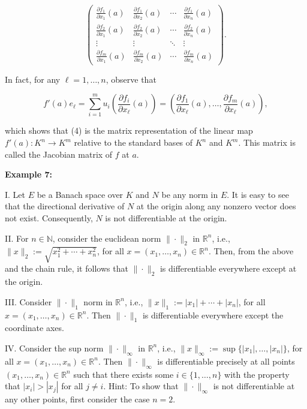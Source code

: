 \documentclass{book}
\begin{document}
\[
\begin{pmatrix}
\frac{\partial f_1}{\partial x_1}(a) & \frac{\partial f_1}{\partial x_2}(a) & \cdots & \frac{\partial f_1}{\partial x_n}(a) \\
\frac{\partial f_2}{\partial x_1}(a) & \frac{\partial f_2}{\partial x_2}(a) & \cdots & \frac{\partial f_2}{\partial x_n}(a) \\
\vdots & \vdots & \ddots & \vdots \\
\frac{\partial f_m}{\partial x_1}(a) & \frac{\partial f_m}{\partial x_2}(a) & \cdots & \frac{\partial f_m}{\partial x_n}(a)
\end{pmatrix}.
\tag{4}
\]

In fact, for any $\ell = 1, \ldots, n$, observe that

\[
f'(a)e_\ell
=
\sum_{i=1}^{m} u_i \left( \frac{\partial f_i}{\partial x_\ell}(a) \right)
=
\left( \frac{\partial f_1}{\partial x_\ell}(a), \ldots, \frac{\partial f_m}{\partial x_\ell}(a) \right),
\]

which shows that (4) is the matrix representation of the linear map $f'(a) : K^n \to K^m$ relative to the standard bases of $K^n$ and $K^m$. This matrix is called the Jacobian matrix of $f$ at $a$.

\textbf{Example 7:}

I. Let $E$ be a Banach space over $K$ and $N$ be any norm in $E$. It is easy to see that the directional derivative of $N$ at the origin along any nonzero vector does not exist. Consequently, $N$ is not differentiable at the origin.

II. For $n \in \mathbb{N}$, consider the euclidean norm $\|\cdot\|_2$ in $\mathbb{R}^n$, i.e., $\|x\|_2 := \sqrt{x_1^2 + \cdots + x_n^2}$, for all $x = (x_1, \ldots, x_n) \in \mathbb{R}^n$. Then, from the above and the chain rule, it follows that $\|\cdot\|_2$ is differentiable everywhere except at the origin.

III. Consider $\|\cdot\|_1$ norm in $\mathbb{R}^n$, i.e., $\|x\|_1 := |x_1| + \cdots + |x_n|$, for all $x = (x_1, \ldots, x_n) \in \mathbb{R}^n$. Then $\|\cdot\|_1$ is differentiable everywhere except the coordinate axes.

IV. Consider the sup norm $\|\cdot\|_\infty$ in $\mathbb{R}^n$, i.e., $\|x\|_\infty := \sup\{|x_1|, \ldots, |x_n|\}$, for all $x = (x_1, \ldots, x_n) \in \mathbb{R}^n$. Then $\|\cdot\|_\infty$ is differentiable precisely at all points $(x_1, \ldots, x_n) \in \mathbb{R}^n$ such that there exists some $i \in \{1, \ldots, n\}$ with the property that $|x_i| > |x_j|$ for all $j \neq i$. Hint: To show that $\|\cdot\|_\infty$ is not differentiable at any other points, first consider the case $n = 2$.
\end{document}

